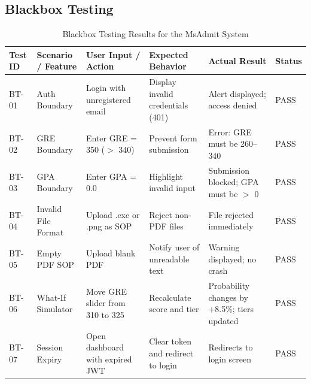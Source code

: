 \endgroup



\clearpage
\subsection{Blackbox Testing}

\begingroup
\small
\setlength{\tabcolsep}{4pt}
\renewcommand{\arraystretch}{1.4}



\begin{table}[htbp]
\centering
\caption{Blackbox Testing Results for the MsAdmit System}
\label{tab:blackbox-testing}

\normalsize
\setlength{\tabcolsep}{5pt}
\renewcommand{\arraystretch}{1.6}

\begin{tabularx}{\textwidth}{
|>{\centering\arraybackslash}p{1.0cm}
|>{\raggedright\arraybackslash}X
|>{\raggedright\arraybackslash}X
|>{\raggedright\arraybackslash}X
|>{\raggedright\arraybackslash}X
|>{\centering\arraybackslash}p{1.2cm}|}
\hline
\textbf{Test ID} &
\textbf{Scenario / Feature} &
\textbf{User Input / Action} &
\textbf{Expected Behavior} &
\textbf{Actual Result} &
\textbf{Status} \\
\hline

BT-01 &
Auth Boundary &
Login with unregistered email &
Display invalid credentials (401) &
Alert displayed; access denied &
PASS \\
\hline

BT-02 &
GRE Boundary &
Enter GRE = 350 ($>$ 340) &
Prevent form submission &
Error: GRE must be 260--340 &
PASS \\
\hline

BT-03 &
GPA Boundary &
Enter GPA = 0.0 &
Highlight invalid input &
Submission blocked; GPA must be $>$ 0 &
PASS \\
\hline

BT-04 &
Invalid File Format &
Upload .exe or .png as SOP &
Reject non-PDF files &
File rejected immediately &
PASS \\
\hline

BT-05 &
Empty PDF SOP &
Upload blank PDF &
Notify user of unreadable text &
Warning displayed; no crash &
PASS \\
\hline

BT-06 &
What-If Simulator &
Move GRE slider from 310 to 325 &
Recalculate score and tier &
Probability changes by +8.5\%; tiers updated &
PASS \\
\hline

BT-07 &
Session Expiry &
Open dashboard with expired JWT &
Clear token and redirect to login &
Redirects to login screen &
PASS \\
\hline

\end{tabularx}
\end{table}
\vspace{25pt}

